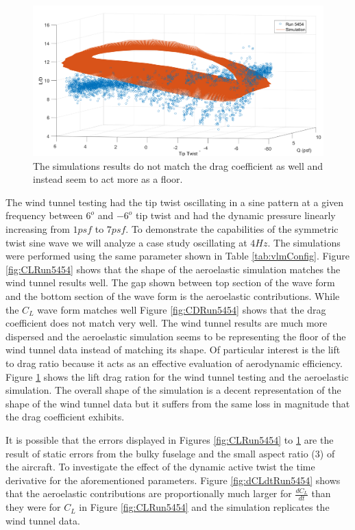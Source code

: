 \documentclass[11pt]{ucthesis}
\begin{document}
\begin{figure}[h]
\centering
\includegraphics[width=.75\linewidth]{Figures/LD5454.png}
\caption{The simulations results do not match the drag coefficient as well and instead seem to act more as a floor.}
\label{fig:LDRun5454}
\end{figure}

The wind tunnel testing had the tip twist oscillating in a sine pattern at a given frequency between $6^o$ and $-6^o$ tip twist and had the dynamic pressure linearly increasing from $1 psf$ to $7 psf$. To demonstrate the capabilities of the symmetric twist sine wave we will analyze a case study oscillating at $4 Hz$. The simulations were performed using the same parameter shown in Table \ref{tab:vlmConfig}. Figure \ref{fig:CLRun5454} shows that the shape of the aeroelastic simulation matches the wind tunnel results well. The gap shown between top section of the wave form and the bottom section of the wave form is the aeroelastic contributions. While the $C_L$ wave form matches well Figure \ref{fig:CDRun5454}  shows that the drag coefficient does not match very well. The wind tunnel results are much more dispersed and the aeroelastic simulation seems to be representing the floor of the wind tunnel data instead of matching its shape. Of particular interest is the lift to drag ratio because it acts as an effective evaluation of aerodynamic efficiency. Figure \ref{fig:LDRun5454} shows the lift drag ration for the wind tunnel testing and the aeroelastic simulation. The overall shape of the simulation is a decent representation of the shape of the wind tunnel data but it suffers from the same loss in magnitude that the drag coefficient exhibits.

It is possible that the errors displayed in Figures \ref{fig:CLRun5454} to \ref{fig:LDRun5454} are the result of static errors from the bulky fuselage and the small aspect ratio (3) of the aircraft. To investigate the effect of the dynamic active twist the time derivative for the aforementioned parameters. Figure \ref{fig:dCLdtRun5454} shows that the aeroelastic contributions are proportionally much larger for $\frac{dC_L}{dt}$ than they were for $C_L$ in Figure \ref{fig:CLRun5454} and the simulation replicates the wind tunnel data.
\end{document}
